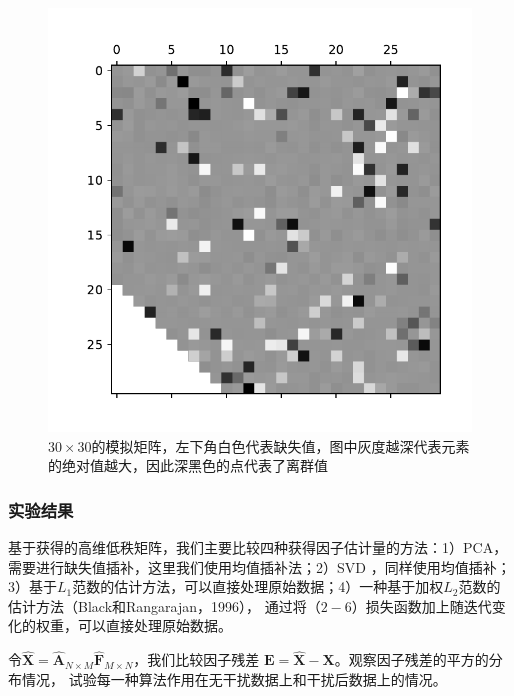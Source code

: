 \begin{figure}[H]
    \centering
    \includegraphics[width=.5\textwidth]{pics/matrix.pdf}
    \caption{\small $30\times30$的模拟矩阵，左下角白色代表缺失值，图中灰度越深代表元素的绝对值越大，因此深黑色的点代表了离群值}
    \label{fig2.1}
\end{figure}

\subsubsection{实验结果}
基于获得的高维低秩矩阵，我们主要比较四种获得因子估计量的方法：1）PCA，需要进行缺失值插补，这里我们使用均值插补法；2）SVD
，同样使用均值插补；3）基于$L_1$范数的估计方法，可以直接处理原始数据；4）一种基于加权$L_2$范数的估计方法（Black和Rangarajan，1996），
通过将（$2-6$）损失函数加上随迭代变化的权重，可以直接处理原始数据。

令$\hat{\bm{X}} = \hat{\bm{A}}_{N \times M}\hat{\bm{F}}_{M \times N}$，我们比较因子残差
$\bm{E} = \hat{\bm{X}} -\bm{X}$。观察因子残差的平方的分布情况，
试验每一种算法作用在无干扰数据上和干扰后数据上的情况。

